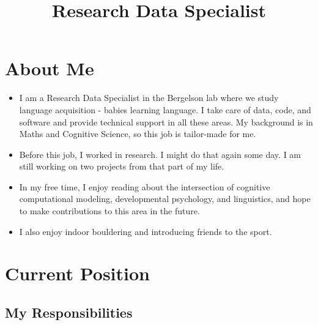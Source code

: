 \documentclass[11pt,a4paper,]{moderncv}
\title{Research Data Specialist}
\providecommand{\tightlist}{%
	\setlength{\itemsep}{0pt}\setlength{\parskip}{0pt}}
\begin{document}
\makecvtitle



\hypertarget{about-me}{%
\section{About Me}\label{about-me}}

\begin{itemize}
\tightlist
\item
  I am a Research Data Specialist in the Bergelson lab where we study
  language acquisition - babies learning language. I take care of data,
  code, and software and provide technical support in all these areas.
  My background is in Maths and Cognitive Science, so this job is
  tailor-made for me.
\item
  Before this job, I worked in research. I might do that again some day.
  I am still working on two projects from that part of my life.
\item
  In my free time, I enjoy reading about the intersection of cognitive
  computational modeling, developmental psychology, and linguistics, and
  hope to make contributions to this area in the future.
\item
  I also enjoy indoor bouldering and introducing friends to the sport.
\end{itemize}

\hypertarget{current-position}{%
\section{Current Position}\label{current-position}}

\nopagebreak

\hypertarget{my-responsibilities}{%
\subsection{My Responsibilities}\label{my-responsibilities}}
\end{document}
